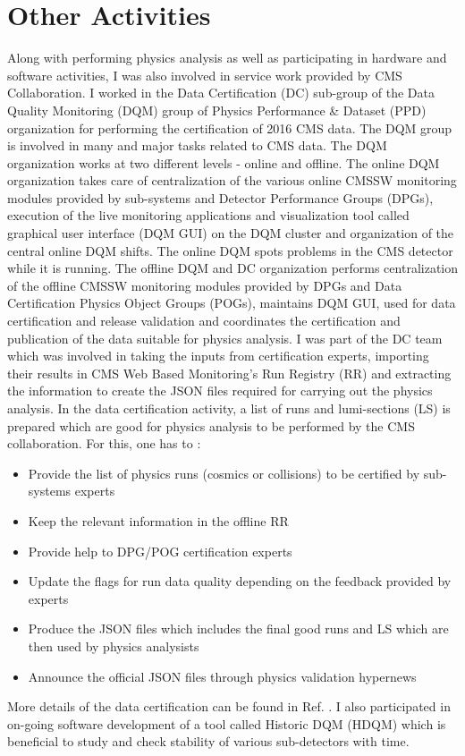 \section{Other Activities}
Along with performing physics analysis as well as participating in hardware and software activities, I was also involved in service work provided by CMS Collaboration. I worked in the Data Certification (DC) sub-group of the Data Quality Monitoring (DQM) group \cite{DQM} of Physics Performance \& Dataset (PPD) organization for performing the certification of 2016 CMS data. The DQM group is involved in many and major tasks related to CMS data. The DQM organization works at two different levels - online and offline. The online DQM organization takes care of centralization of the various online CMSSW monitoring modules provided by sub-systems and  Detector Performance Groups (DPGs), execution of the live monitoring applications and visualization tool called graphical user interface (DQM GUI) on the DQM cluster and organization of the central online DQM shifts. The online DQM spots problems in the CMS detector while it is running. The offline DQM and DC organization performs centralization of the offline CMSSW monitoring modules provided by DPGs and Data Certification Physics Object Groups (POGs), maintains DQM GUI, used for data certification and release validation and coordinates the certification and publication of the data suitable for physics analysis. I was part of the DC team which was involved in taking the inputs from certification experts, importing their results in CMS Web Based Monitoring's Run Registry (RR) and extracting the information to create the JSON files required for carrying out the physics analysis. In the data certification activity, a list of runs and lumi-sections (LS) is prepared which are good for physics analysis to be performed by the CMS collaboration. For this, one has to :

\begin{itemize}
\item Provide the list of physics runs (cosmics or collisions) to be certified by sub-systems experts
\item Keep the relevant information in the offline RR
\item Provide help to DPG/POG certification experts
\item Update the flags for run data quality depending on the feedback provided by experts
\item Produce the JSON files which includes the final good runs and LS which are then used by physics analysists
\item Announce the official JSON files through physics validation hypernews 
\end{itemize}

More details of the data certification can be found in Ref. \cite{DC}. I also participated in on-going software development of a tool called Historic DQM (HDQM) which is beneficial to study and check stability of various sub-detectors with time.

